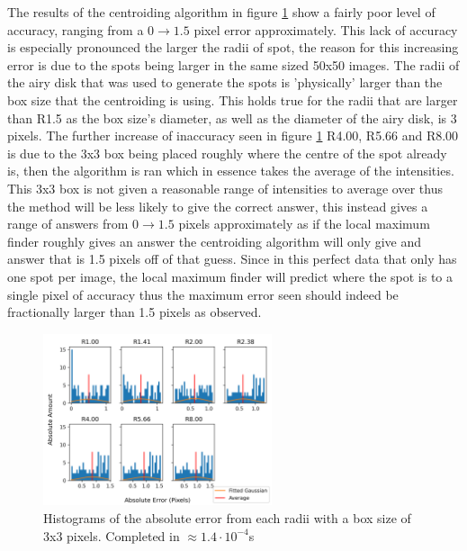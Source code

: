 \documentclass[aps,pra,a4paper,nofootinbib,onecolumn,tightenlines,longbibliography,12pt,amsfonts,amssymb,amsmath,floatfix]{revtex4-2} %
\begin{document}
  The results of the centroiding algorithm in figure \ref{fig:box_3} show a fairly poor 
  level of accuracy, ranging from a $0\rightarrow 1.5$ pixel error approximately. This lack of accuracy 
  is especially pronounced the larger the radii of spot, the reason for this increasing 
  error is due to the spots being larger in the same sized 50x50 images. The radii of the 
  airy disk that was used to generate the spots is 'physically' larger than the box size 
  that the centroiding is using. This holds true for the radii that are larger than R1.5 
  as the box size's diameter, as well as the diameter of the airy disk, is 3 pixels. The further 
  increase of inaccuracy seen in figure \ref{fig:box_3} R4.00, R5.66 and R8.00 is due to the 
  3x3 box being placed roughly where the centre of the spot already is, then the algorithm is 
  ran which in essence takes the average of the intensities. This 3x3 box is not given a reasonable 
  range of intensities to average over thus the method will be less likely to give the correct answer,
  this instead gives a range of answers from $0\rightarrow 1.5$ pixels approximately as if the 
  local maximum finder roughly gives an answer the centroiding algorithm will only give and answer 
  that is 1.5 pixels off of that guess. Since in this perfect data that only has one spot per image, the 
  local maximum finder will predict where the spot is to a single pixel of accuracy thus the maximum 
  error seen should indeed be fractionally larger than 1.5 pixels as observed.

  \begin{figure}[h]
    \begin{center}
      \includegraphics[width=0.6\textwidth]{project_pics/distro_centriod_3.png}
    \end{center}
    \caption{Histograms of the absolute error from each radii with a box size of 3x3 pixels. Completed in $\approx 1.4\cdot 10^{-4}$s}
    \label{fig:box_3}
  \end{figure}
\end{document}
